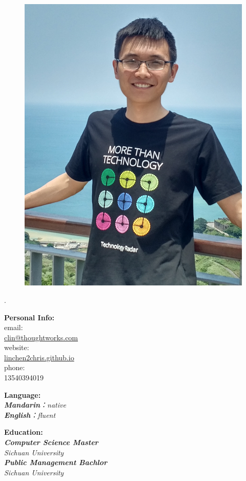 \documentclass[a3paper,12pt,final]{memoir}
\newcommand{\myThemeColor}{RoyalBlue}
\newcommand{\SmallSep}{\vspace{0.9em}}
\newcommand{\CVItem}[1]
	{\textbf{\color{\myThemeColor} #1}}
\begin{document}
\begin{CJK*}{UTF8}{gbsn}%
\begin{figure}
	\hfill
	\includegraphics[width=0.7\columnwidth]{photo}
	\vspace{-7cm}
\end{figure}
\begin{flushright}\footnotesize
.\\
\vskip 6cm
\raggedright
\CVItem{{\large Personal Info:}}\\
email:\\
	\href{mailto:clin@thoughtworks.com}{clin@thoughtworks.com}  \\
	website:\\
	\href{http://linchen2chris.github.io/}{linchen2chris.github.io} \\
	phone:\\ 13540394019	
  
	\CVItem{{\large Language:}}\\
  \SmallSep
	\textit{\textbf{Mandarin}：native \\\textbf{English}：fluent\\}
	
  \vskip 1cm
  \CVItem{{\large Education:}}\\
  \SmallSep
	\textit{\textbf{Computer Science Master}\\
    Sichuan University\\
    \textbf{Public Management Bachlor}\\
    Sichuan University\\}


\end{flushright}
\end{CJK*}
\end{document}
